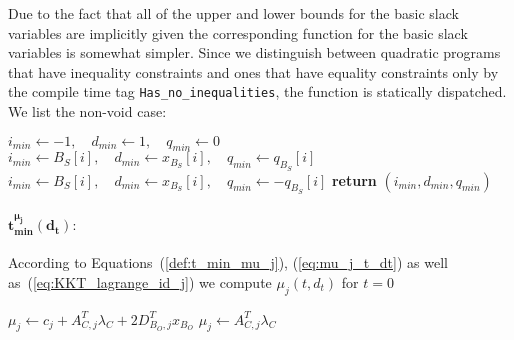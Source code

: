 \documentclass[a4paper]{article}
\begin{document}
Due to the fact that all of the upper and lower bounds for the basic slack
variables are implicitly given the corresponding function for the basic slack
variables is somewhat simpler. Since we distinguish between quadratic programs
that have inequality constraints and ones that have equality constraints only
by the compile time tag \texttt{Has\_no\_inequalities}, the function
is statically dispatched. We list the non-void case:
\begin{algorithmic}
\State $i_{min} \gets -1, \quad     d_{min} \gets 1, \quad  q_{min} \gets 0$
                \State $i_{min} \gets B_{S}[i],
                    \quad d_{min} \gets x_{B_{S}}[i],
                    \quad q_{min} \gets q_{B_{S}}[i]$
            \EndIf	
        \EndIf 
    \EndFor
\Else
                \State $i_{min} \gets B_{S}[i],
                    \quad d_{min} \gets x_{B_{S}}[i],
                    \quad q_{min} \gets -q_{B_{S}}[i]$
            \EndIf	
        \EndIf 
    \EndFor
\EndIf
\State \textbf{return} $(i_{min}, d_{min}, q_{min})$
\EndFunction
\end{algorithmic}
\paragraph{$\mathbf{t_{min}^{\mu_{j}}(d_{t}):}$}
According to Equations~(\ref{def:t_min_mu_j}), (\ref{eq:mu_j_t_dt}) as well
as~(\ref{eq:KKT_lagrange_id_j}) we compute $\mu_{j}(t, d_{t})$ for $t=0$ 
\begin{algorithmic}
    \State $\mu_{j} \gets c_{j}+A_{C,j}^{T}\lambda_{C}
        +2D_{B_{O},j}^{T}x_{B_{O}}$
\Else
    \State $\mu_{j} \gets A_{C,j}^{T}\lambda_{C}$
\EndIf 
\EndFunction
\end{algorithmic}
\end{document}
